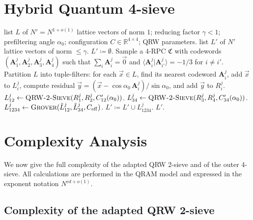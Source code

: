 \documentclass[10pt,a4paper]{article}
\begin{document}
\section{Hybrid Quantum 4-sieve}

\begin{algorithm}[H]
\caption{Hybrid Quantum 4-sieve}
\label{alg:main}
\begin{algorithmic}[1]
\Require list \(L\) of \(N' = N^{1+o(1)}\) lattice vectors of norm \(1\); reducing factor \(\gamma < 1\); prefiltering angle \(\alpha_0\); configuration \(C\in\mathbb{R}^{4\times 4}\); QRW parameters.
\Ensure list \(L'\) of \(N'\) lattice vectors of norm \(\le \gamma\).
\State \(L' \coloneqq \emptyset\).
    \State Sample a 4-RPC \(\mathfrak{C}\) with codewords \((\mathbf{A}_1^j,\mathbf{A}_2^j,\mathbf{A}_3^j,\mathbf{A}_4^j)\) such that \(\sum_i \mathbf{A}_i^j = \vec{0}\) and \(\langle \mathbf{A}_i^j|\mathbf{A}_{i'}^j\rangle = -1/3\) for \(i\neq i'\).
    \State Partition \(L\) into tuple-filters: for each \(\vec{x}\in L\), find its nearest codeword \(\mathbf{A}_i^j\), add \(\vec{x}\) to \(L_i^j\), compute residual \(\vec{y} = (\vec{x}-\cos\alpha_0\,\mathbf{A}_i^j)/\sin\alpha_0\), and add \(\vec{y}\) to \(R_i^j\).
        \State \(L_{12}^j \leftarrow \textsc{QRW-2-Sieve}(R_1^j, R_2^j, C'_{12}(\alpha_0))\).
        \State \(L_{34}^j \leftarrow \textsc{QRW-2-Sieve}(R_3^j, R_4^j, C'_{34}(\alpha_0))\).
        \State \(L_{1234}^j \leftarrow \textsc{Grover}(\tilde{L}_{12}^j, \tilde{L}_{34}^j, C_{\mathrm{eff}})\).
        \State \(L' \coloneqq L' \cup L_{1234}^j\).
    \EndFor
\EndWhile
\State \Return \(L'\).
\end{algorithmic}
\end{algorithm}

\section{Complexity Analysis}

We now give the full complexity of the adapted QRW 2-sieve and of the outer 4-sieve. All calculations are performed in the QRAM model and expressed in the exponent notation \(N^{cd+o(1)}\).

\subsection{Complexity of the adapted QRW 2-sieve}
\end{document}
